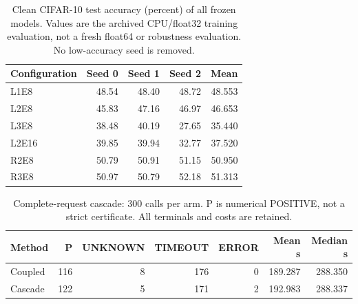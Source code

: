 \begin{table}[ht]
\centering\small
\caption{Clean CIFAR-10 test accuracy (percent) of all frozen models. Values are the archived CPU/float32 training evaluation, not a fresh float64 or robustness evaluation. No low-accuracy seed is removed.}
\label{tab:models}
\begin{tabular}{lrrrr}
\toprule
Configuration & Seed 0 & Seed 1 & Seed 2 & Mean \\
\midrule
L1E8 & 48.54 & 48.40 & 48.72 & 48.553 \\
L2E8 & 45.83 & 47.16 & 46.97 & 46.653 \\
L3E8 & 38.48 & 40.19 & 27.65 & 35.440 \\
L2E16 & 39.85 & 39.94 & 32.77 & 37.520 \\
R2E8 & 50.79 & 50.91 & 51.15 & 50.950 \\
R3E8 & 50.97 & 50.79 & 52.18 & 51.313 \\
\bottomrule
\end{tabular}
\end{table}

\begin{table}[ht]
\centering\small
\caption{Complete-request cascade: 300 calls per arm. P is numerical POSITIVE, not a strict certificate. All terminals and costs are retained.}
\label{tab:primary}
\begin{tabular}{lrrrrrr}
\toprule
Method & P & UNKNOWN & TIMEOUT & ERROR & Mean s & Median s \\
\midrule
Coupled & 116 & 8 & 176 & 0 & 189.287 & 288.350 \\
Cascade & 122 & 5 & 171 & 2 & 192.983 & 288.337 \\
\bottomrule
\end{tabular}
\end{table}

